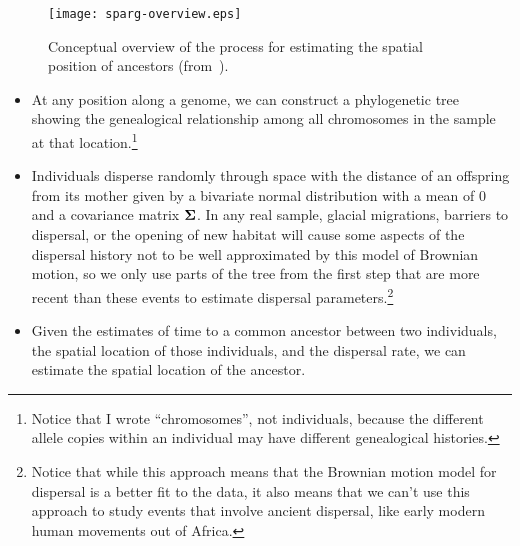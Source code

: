 \documentclass[12pt]{article}
\begin{document}
\begin{figure}
  \begin{center}
    \texttt{[image: sparg-overview.eps]}
  \end{center}
  \caption{Conceptual overview of the process for estimating the
    spatial position of ancestors
    (from~\cite{Osmond-Coop-2021}).}\label{fig:sparg-overview} 
\end{figure}

\begin{itemize}

  \item At any position along a genome, we can construct a
    phylogenetic tree showing the genealogical relationship among all
    chromosomes in the sample at that location.\footnote{Notice that I
      wrote ``chromosomes'', not individuals, because the different
      allele copies within an individual may have different
      genealogical histories.} 

  \item Individuals disperse randomly through space with the distance
    of an offspring from its mother given by a bivariate normal
    distribution with a mean of 0 and a covariance matrix
    $\bf\Sigma$. In any real sample, glacial migrations,
    barriers to dispersal, or the opening of new habitat will cause
    some aspects of the dispersal history not to be well approximated
    by this model of Brownian motion, so we only use parts of the tree
    from the first step that are more recent than these events to
    estimate dispersal parameters.\footnote{Notice that while this
      approach means that the Brownian motion model for dispersal is a
      better fit to the data, it also means that we can't use this
      approach to study events that involve ancient dispersal, like
      early modern human movements out of Africa.}

  \item Given the estimates of time to a common ancestor between two
    individuals, the spatial location of those individuals, and the
    dispersal rate, we can estimate the spatial location of the
    ancestor. 

\end{itemize}
\end{document}
